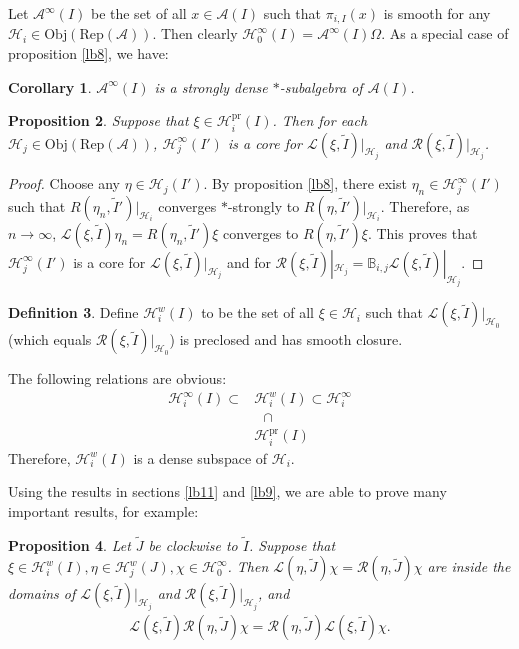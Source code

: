 \documentclass[12pt,a4paper]{article}
\theoremstyle{definition}
\newtheorem{df}{Definition}[subsection]
\theoremstyle{plain}
\newtheorem{pp}[df]{Proposition}
\newtheorem{co}[df]{Corollary}
\newcommand{\mc}{\mathcal}
\newcommand{\wtd}{\widetilde}
\newcommand{\scr}{\mathscr}
\newcommand{\RepA}{\mathrm{Rep}(\mc A)}
\newcommand{\mbb}{\mathbb}
\newcommand{\Obj}{\mathrm{Obj}}
\newcommand{\pr}{\mathrm{pr}}
\numberwithin{equation}{subsection}
\begin{document}
Let $\mc A^\infty(I)$ be the set of all $x\in\mc A(I)$ such that $\pi_{i,I}(x)$ is smooth for any $\mc H_i\in\Obj(\RepA)$. Then clearly $\mc H^\infty_0(I)=\mc A^\infty(I)\Omega$. As a special case of proposition \ref{lb8}, we have:

\begin{co}\label{lb24}
$\mc A^\infty(I)$ is a strongly dense $*$-subalgebra of $\mc A(I)$.
\end{co}

\begin{pp}\label{lb21}
Suppose that $\xi\in\mc H_i^\pr(I)$. Then for each $\mc H_j\in\Obj(\RepA)$, $\mc H_j^\infty(I')$ is a core for $\scr L(\xi,\wtd I)|_{\mc H_j}$ and $\scr R(\xi,\wtd I)|_{\mc H_j}$.
\end{pp}

\begin{proof}
Choose any $\eta\in\mc H_j(I')$. By proposition \ref{lb8}, there exist $\eta_n\in\mc H_j^\infty(I')$ such that $R(\eta_n,\wtd I')|_{\mc H_i}$ converges $*$-strongly to $R(\eta,\wtd I')|_{\mc H_i}$. Therefore, as $n\rightarrow\infty$, $\scr L(\xi,\wtd I)\eta_n=R(\eta_n,\wtd I')\xi$ converges to $R(\eta,\wtd I')\xi$. This proves that $\mc H_j^\infty(I')$ is a core for $\scr L(\xi,\wtd I)|_{\mc H_j}$ and for $\scr R(\xi,\wtd I)|_{\mc H_j}=\mbb B_{i,j}\scr L(\xi,\wtd I)|_{\mc H_j}$.
\end{proof}





\begin{df}
Define $\mc H_i^w(I)$ \index{Hi@$\mc H_i^w(I)$} to be the set of all $\xi\in\mc H_i$ such that $\scr L(\xi,\wtd I)|_{\mc H_0}$ (which equals $\scr R(\xi,\wtd I)|_{\mc H_0}$) is preclosed and has smooth closure. 
\end{df}

The following relations are obvious:
\begin{align*}
\mc H_i^\infty(I)\subset&\mc H_i^w(I)\subset\mc H_i^\infty\\
&~~~\cap\\
&\mc H_i^\pr(I)
\end{align*}
Therefore, $\mc H_i^w(I)$ is a dense subspace of $\mc H_i$.






Using the  results in sections \ref{lb11} and \ref{lb9}, we are able to prove many important results, for example:

\begin{pp}\label{lb28}
Let $\wtd J$ be clockwise to $\wtd I$. Suppose that $\xi\in\mc H_i^w(I),\eta\in\mc H_j^w(J),\chi\in\mc H_0^\infty$. Then $\scr L(\eta,\wtd J)\chi=\scr R(\eta,\wtd J)\chi$ are inside the domains of $\scr L(\xi,\wtd I)|_{\mc H_j}$ and $\scr R(\xi,\wtd I)|_{\mc H_j}$, and 
\begin{align}
\scr L(\xi,\wtd I)\scr R(\eta,\wtd J)\chi=\scr R(\eta,\wtd J)\scr L(\xi,\wtd I)\chi.
\end{align}
\end{pp}
\end{document}
